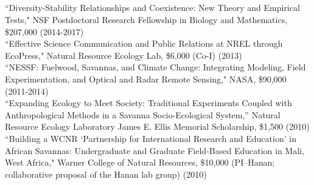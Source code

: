 \documentclass[margin,line]{resume}
\begin{document}
\begin{resume}
    \section{\textmd{\textsf{}}}
    ``Diversity-Stability Relationships and Coexistence: New Theory and Empirical Tests," NSF Postdoctoral Research Fellowship in Biology and Mathematics, \$207,000 (2014-2017)\vspace{2mm}\\%
    ``Effective Science Communication and Public Relations at NREL through EcoPress," Natural Resource Ecology Lab, \$6,000 (Co-I) (2013) \vspace{2mm}\\%
    ``NESSF: Fuelwood, Savannas, and Climate Change: Integrating Modeling, Field Experimentation, and Optical and Radar Remote Sensing," NASA, \$90,000 (2011-2014) \vspace{2mm}\\%
    ``Expanding Ecology to Meet Society: Traditional Experiments Coupled with Anthropological Methods in a Savanna Socio-Ecological System,'' Natural Resource Ecology Laboratory James E. Ellis Memorial Scholarship, \$1,500 (2010)\vspace{2mm}\\%
    ``Building a WCNR `Partnership for International Research and Education' in African Savannas: Undergraduate and Graduate Field-Based Education in Mali, West Africa," Warner College of Natural Resources, \$10,000 (PI--Hanan; collaborative proposal of the Hanan lab group) (2010)%
    
    

\end{resume}
\end{document}
